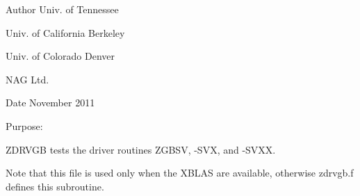 \begin{DoxyAuthor}{Author}
Univ. of Tennessee 

Univ. of California Berkeley 

Univ. of Colorado Denver 

N\+A\+G Ltd. 
\end{DoxyAuthor}
\begin{DoxyDate}{Date}
November 2011
\end{DoxyDate}
\begin{DoxyParagraph}{Purpose\+: }
\begin{DoxyVerb} ZDRVGB tests the driver routines ZGBSV, -SVX, and -SVXX.

 Note that this file is used only when the XBLAS are available,
 otherwise zdrvgb.f defines this subroutine.\end{DoxyVerb}
 
\end{DoxyParagraph}

